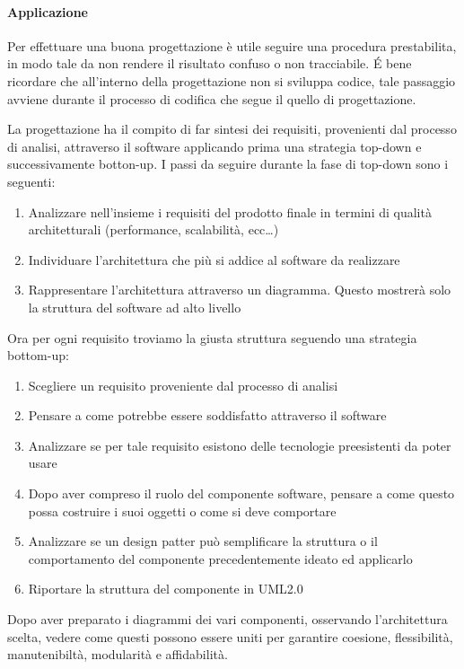         \paragraph{Applicazione} \label{PP:progettazione:applicazione}
        Per effettuare una buona progettazione è utile seguire una procedura prestabilita, in modo tale da non rendere il risultato confuso o non tracciabile. \'E bene ricordare che all'interno della progettazione non si sviluppa codice, tale passaggio avviene durante il processo di codifica che segue il quello di progettazione. \par
        La progettazione ha il compito di far sintesi dei requisiti, provenienti dal processo di analisi, attraverso il software applicando prima una strategia top-down e successivamente botton-up. I passi da seguire durante la fase di top-down sono i seguenti:
        \begin{enumerate}
            \item Analizzare nell'insieme i requisiti del prodotto finale in termini di qualità architetturali (performance, scalabilità, ecc\dots)
            \item Individuare l'architettura che più si addice al software da realizzare
            \item Rappresentare l'architettura attraverso un diagramma. Questo mostrerà solo la struttura del software ad alto livello
        \end{enumerate}
        Ora per ogni requisito troviamo la giusta struttura seguendo una strategia bottom-up:
        \begin{enumerate}
            \item Scegliere un requisito proveniente dal processo di analisi
            \item Pensare a come potrebbe essere soddisfatto attraverso il software
            \item Analizzare se per tale requisito esistono delle tecnologie preesistenti da poter usare
            \item Dopo aver compreso il ruolo del componente software, pensare a come questo possa costruire i suoi oggetti o come si deve comportare
            \item Analizzare se un design patter può semplificare la struttura o il comportamento del componente precedentemente ideato ed applicarlo
            \item Riportare la struttura del componente in UML2.0
        \end{enumerate}
        Dopo aver preparato i diagrammi dei vari componenti, osservando l'architettura scelta, vedere come questi possono essere uniti per garantire coesione, flessibilità, manutenibiltà, modularità e affidabilità.

